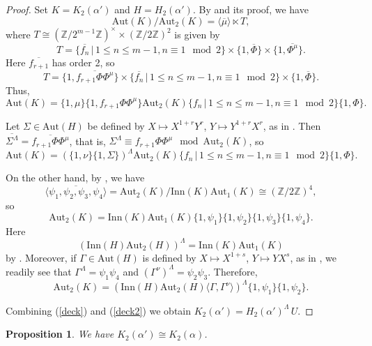 \documentclass{amsart}
\newtheorem{prop}[theorem]{Proposition}
\theoremstyle{definition}
\theoremstyle{remark}
\newcommand \Z{{\mathbb Z}}
\begin{document}
\begin{proof} Set $K=K_2(\alpha')$ and $H=H_2(\alpha')$. By \cite[Theorem 5.13]{MS3} and its proof, we have
$$
\mathrm{Aut}(K)/\mathrm{Aut}_2(K)=\langle \overline{\mu}\rangle\ltimes T,
$$
where $T\cong (\Z/2^{m-1}\Z)^\times \times (\Z/2\Z)^2$ is given by
$$T=\{\overline{f_n}\,|\, 1\leq n\leq m-1, n\equiv 1\mod 2\}\times\{1,\overline{\Phi}\}\times\{1,\overline{\Phi^\mu}\}.
$$
Here $\overline{f_{r+1}}$ has order 2, so
$$
T=\{1,\overline{f_{r+1}\Phi\Phi^\mu}\}\times\{\overline{f_n}\,|\, 1\leq n\leq m-1, n\equiv 1\mod 2\}\times\{1,\overline{\Phi}\}.
$$
Thus,
$$
\mathrm{Aut}(K)=\{1, \mu\}\{1,f_{r+1}\Phi\Phi^\mu\}\mathrm{Aut}_2(K)\{f_n\,|\, 1\leq n\leq m-1, n\equiv 1\mod 2\}
\{1,\Phi\}.
$$

Let $\Sigma\in \mathrm{Aut}(H)$ be defined by $X\mapsto X^{1+r}Y^r$, $Y\mapsto Y^{1+r}X^r$, as in \cite[Corollary 6.12]{MS3}.
Then $\overline{\Sigma^\Lambda}=\overline{f_{r+1}\Phi\Phi^\mu}$, that is, $\Sigma^\Lambda\equiv f_{r+1}\Phi\Phi^\mu\mod \mathrm{Aut}_2(K)$,
so
\begin{equation}
\label{deck}
\mathrm{Aut}(K)=(\{1, \nu\}\{1,\Sigma\})^\Lambda \mathrm{Aut}_2(K)\{f_n\,|\, 1\leq n\leq m-1, n\equiv 1\mod 2\}
\{1,\Phi\}.
\end{equation}

On the other hand, by \cite[Proposition 5.16]{MS3}, we have
$$
\overline{\langle \psi_1, \psi_2, \psi_3, \psi_4\rangle}=\mathrm{Aut}_2(K)/\mathrm{Inn}(K)\mathrm{Aut}_1(K)\cong (\Z/2\Z)^4,
$$
so
$$
\mathrm{Aut}_2(K)=\mathrm{Inn}(K)\mathrm{Aut}_1(K)\{1,\psi_1\}\{1,\psi_2\}\{1,\psi_3\}\{1,\psi_4\}.
$$
Here
$$
(\mathrm{Inn}(H)\mathrm{Aut}_2(H))^\Lambda=\mathrm{Inn}(K)\mathrm{Aut}_1(K)
$$
by \cite[Proposition 7.2]{MS3}. Moreover, if $\Gamma\in\mathrm{Aut}(H)$ is defined by $X\mapsto X^{1+s}$, $Y\mapsto YX^s$, as in
\cite[Proposition 6.8]{MS3}, we readily see that $\Gamma^\Lambda=\psi_1\psi_4$ and
$(\Gamma^\nu)^\Lambda=\psi_2\psi_3$. Therefore,
\begin{equation}
\label{deck2}
\mathrm{Aut}_2(K)=(\mathrm{Inn}(H)\mathrm{Aut}_2(H)\langle\Gamma,\Gamma^\nu\rangle)^\Lambda \{1,\psi_1\}\{1,\psi_2\}.
\end{equation}

Combining (\ref{deck}) and (\ref{deck2}) we obtain $K_2(\alpha')=H_2(\alpha')^\Lambda\, U$.
\end{proof}

\begin{prop}\label{isoK} We have $K_2(\alpha')\cong K_2(\alpha)$.
\end{prop}
\end{document}
